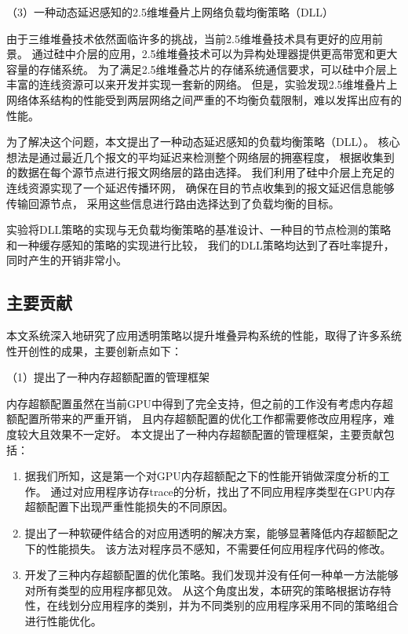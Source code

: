 （3）一种动态延迟感知的2.5维堆叠片上网络负载均衡策略（DLL）

由于三维堆叠技术依然面临许多的挑战，当前2.5维堆叠技术具有更好的应用前景。
通过硅中介层的应用，2.5维堆叠技术可以为异构处理器提供更高带宽和更大容量的存储系统。
为了满足2.5维堆叠芯片的存储系统通信要求，可以硅中介层上丰富的连线资源可以来开发并实现一套新的网络。
但是，实验发现2.5维堆叠片上网络体系结构的性能受到两层网络之间严重的不均衡负载限制，难以发挥出应有的性能。

为了解决这个问题，本文提出了一种动态延迟感知的负载均衡策略（DLL）。
核心想法是通过最近几个报文的平均延迟来检测整个网络层的拥塞程度，
根据收集到的数据在每个源节点进行报文网络层的路由选择。
我们利用了硅中介层上充足的连线资源实现了一个延迟传播环网，
确保在目的节点收集到的报文延迟信息能够传输回源节点，
采用这些信息进行路由选择达到了负载均衡的目标。

实验将DLL策略的实现与无负载均衡策略的基准设计、一种目的节点检测的策略和一种缓存感知的策略的实现进行比较，
我们的DLL策略均达到了吞吐率提升，同时产生的开销非常小。


\subsection{主要贡献}
本文系统深入地研究了应用透明策略以提升堆叠异构系统的性能，取得了许多系统性开创性的成果，主要创新点如下：

（1）提出了一种内存超额配置的管理框架

内存超额配置虽然在当前GPU中得到了完全支持，但之前的工作没有考虑内存超额配置所带来的严重开销，
且内存超额配置的优化工作都需要修改应用程序，难度较大且效果不一定好。
本文提出了一种内存超额配置的管理框架，主要贡献包括：
\renewcommand*\theenumi{(\alph{enumi})}
\begin{enumerate}
\setlength\itemsep{1pt}
\item 据我们所知，这是第一个对GPU内存超额配之下的性能开销做深度分析的工作。
通过对应用程序访存trace的分析，找出了不同应用程序类型在GPU内存超额配置下出现严重性能损失的不同原因。
\item 提出了一种软硬件结合的对应用透明的解决方案，能够显著降低内存超额配之下的性能损失。
该方法对程序员不感知，不需要任何应用程序代码的修改。
\item 开发了三种内存超额配置的优化策略。我们发现并没有任何一种单一方法能够对所有类型的应用程序都见效。
从这个角度出发，本研究的策略根据访存特性，在线划分应用程序的类别，并为不同类别的应用程序采用不同的策略组合进行性能优化。
\end{enumerate}

